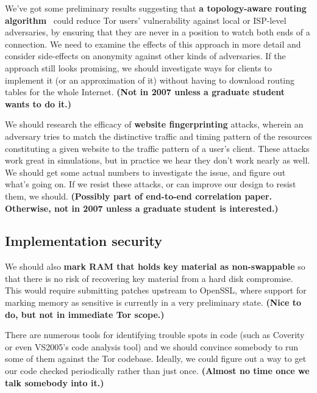 \documentclass{article}
\newcommand{\tmp}[1]{{\bf #1} [......] \\}
\newcommand{\plan}[1]{ {\bf (#1)}}
\begin{document}
We've got some preliminary results suggesting that {\bf a topology-aware
  routing algorithm}~\cite{feamster:wpes2004} could reduce Tor users'
vulnerability against local or ISP-level adversaries, by ensuring that they
are never in a position to watch both ends of a connection.  We need to
examine the effects of this approach in more detail and consider side-effects
on anonymity against other kinds of adversaries.  If the approach still looks
promising, we should investigate ways for clients to implement it (or an
approximation of it) without having to download routing tables for the whole
Internet. \plan{Not in 2007 unless a graduate student wants to do it.}

%

We should research the efficacy of {\bf website fingerprinting} attacks,
wherein an adversary tries to match the distinctive traffic and timing
pattern of the resources constituting a given website to the traffic pattern
of a user's client.  These attacks work great in simulations, but in
practice we hear they don't work nearly as well.  We should get some actual
numbers to investigate the issue, and figure out what's going on.  If we
resist these attacks, or can improve our design to resist them, we should.
\plan{Possibly part of end-to-end correlation paper.  Otherwise, not in 2007
  unless a graduate student is interested.}

\subsection{Implementation security}

We should also {\bf mark RAM that holds key material as non-swappable} so
that there is no risk of recovering key material from a hard disk
compromise.  This would require submitting patches upstream to OpenSSL, where
support for marking memory as sensitive is currently in a very preliminary
state.\plan{Nice to do, but not in immediate Tor scope.}

There are numerous tools for identifying trouble spots in code (such as
Coverity or even VS2005's code analysis tool) and we should convince somebody
to run some of them against the Tor codebase.  Ideally, we could figure out a
way to get our code checked periodically rather than just once.\plan{Almost
  no time once we talk somebody into it.}
\end{document}
